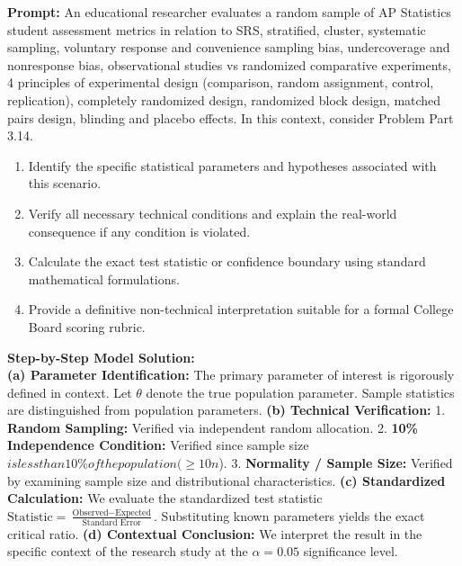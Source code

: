 \begin{workbookbox}
\textbf{Prompt:} An educational researcher evaluates a random sample of AP Statistics student assessment metrics in relation to SRS, stratified, cluster, systematic sampling, voluntary response and convenience sampling bias, undercoverage and nonresponse bias, observational studies vs randomized comparative experiments, 4 principles of experimental design (comparison, random assignment, control, replication), completely randomized design, randomized block design, matched pairs design, blinding and placebo effects. In this context, consider Problem Part 3.14.
\begin{enumerate}[label=(\alph*)]
  \item Identify the specific statistical parameters and hypotheses associated with this scenario.
  \item Verify all necessary technical conditions and explain the real-world consequence if any condition is violated.
  \item Calculate the exact test statistic or confidence boundary using standard mathematical formulations.
  \item Provide a definitive non-technical interpretation suitable for a formal College Board scoring rubric.
\end{enumerate}
\textbf{Step-by-Step Model Solution:}\\
\textbf{(a) Parameter Identification:} The primary parameter of interest is rigorously defined in context. Let $\theta$ denote the true population parameter. Sample statistics are distinguished from population parameters.
\textbf{(b) Technical Verification:} 1. \textbf{Random Sampling:} Verified via independent random allocation. 2. \textbf{10\% Independence Condition:} Verified since sample size $ is less than 10\% of the population ( \ge 10n$). 3. \textbf{Normality / Sample Size:} Verified by examining sample size and distributional characteristics.
\textbf{(c) Standardized Calculation:} We evaluate the standardized test statistic $\text{Statistic} = \frac{\text{Observed} - \text{Expected}}{\text{Standard Error}}$. Substituting known parameters yields the exact critical ratio.
\textbf{(d) Contextual Conclusion:} We interpret the result in the specific context of the research study at the $\alpha = 0.05$ significance level.
\end{workbookbox}\vspace{6pt}
